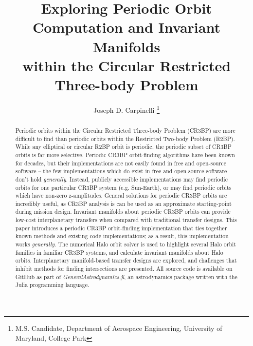 \documentclass[conf]{new-aiaa}
\title{Exploring Periodic Orbit Computation and Invariant Manifolds \\ within the Circular Restricted Three-body Problem}
\author{Joseph D. Carpinelli
    \footnote{
        M.S. Candidate, 
        Department of Aerospace Engineering, 
        University of Maryland, College Park}}
\begin{document}
\maketitle

\begin{abstract}
    Periodic orbits within the Circular Restricted Three-body Problem 
    (CR3BP) are more difficult to find than periodic orbits within the 
    Restricted Two-body Problem (R2BP). While any  elliptical or circular 
    R2BP orbit is periodic, the periodic subset of CR3BP orbits is far 
    more selective. Periodic CR3BP orbit-finding algorithms 
    have been known for decades, but their implementations are not easily
    found in free and open-source software -- the few implementations
    which do exist in free and open-source software don't hold 
    \textit{generally}. Instead, publicly accessible implementations may 
    find periodic orbits for one particular CR3BP system (e.g. Sun-Earth), 
    or  may find periodic orbits which have non-zero z-amplitudes. 
    General solutions for periodic CR3BP orbits are incredibly useful, as 
    CR3BP analysis is can be used as an approximate starting-point during 
    mission design. Invariant manifolds about periodic 
    CR3BP orbits can provide low-cost interplanetary transfers when 
    compared with traditional transfer designs. This paper introduces 
    a periodic CR3BP orbit-finding implementation that ties together
    known methods and existing code implementations; as a result, 
    this implementation works \textit{generally}. The numerical Halo 
    orbit solver is used to highlight several
    Halo orbit families in familiar CR3BP systems, and calculate invariant 
    manifolds about Halo orbits. Interplanetary manifold-based transfer
    designs are explored, and challenges that inhibit methods for 
    finding intersections are presented. All source code 
    is available on GitHub as part of 
    \textit{GeneralAstrodynamics.jl}, an astrodynamics package written 
    with the Julia programming language.
\end{abstract}
\end{document}
